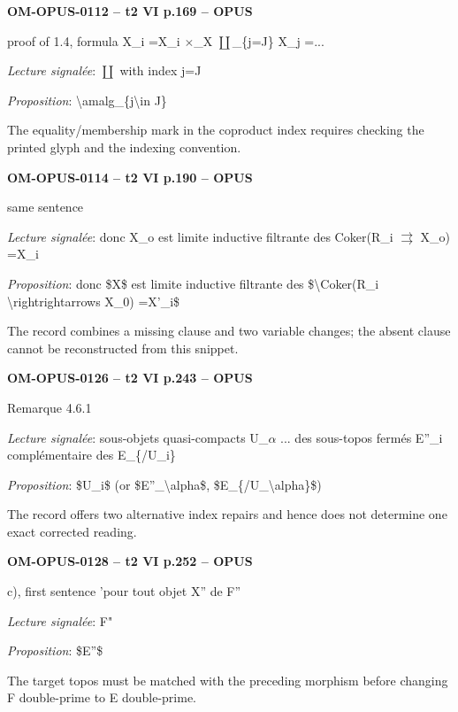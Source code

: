 \par\noindent\textbf{OM-OPUS-0112 -- t2 VI p.169 -- OPUS}\par
proof of 1.4, formula X\_i =\allowbreak  X\_i \ensuremath{\times}\_X \ensuremath{\coprod}\_\{j=\allowbreak J\} X\_j =\allowbreak  ...\par
\emph{Lecture signalée}: \ensuremath{\coprod} with index j=\allowbreak J\par
\emph{Proposition}: \textbackslash{}amalg\_\{j\textbackslash{}in J\}\par
The equality/membership mark in the coproduct index requires checking the printed glyph and the indexing convention.\par
\par\noindent\textbf{OM-OPUS-0114 -- t2 VI p.190 -- OPUS}\par
same sentence\par
\emph{Lecture signalée}: donc X\_o est limite inductive filtrante des Coker(R\_i \ensuremath{\rightrightarrows} X\_o) =\allowbreak  X\_i\par
\emph{Proposition}: donc \$X\$ est limite inductive filtrante des \$\textbackslash{}Coker(R\_i \textbackslash{}rightrightarrows X\_0) =\allowbreak  X'\_i\$\par
The record combines a missing clause and two variable changes; the absent clause cannot be reconstructed from this snippet.\par
\par\noindent\textbf{OM-OPUS-0126 -- t2 VI p.243 -- OPUS}\par
Remarque 4.6.1\par
\emph{Lecture signalée}: sous-objets quasi-compacts U\_\ensuremath{\alpha} ... des sous-topos fermés E''\_i complémentaire des E\_\{/U\_i\}\par
\emph{Proposition}: \$U\_i\$ (or \$E''\_\textbackslash{}alpha\$, \$E\_\{/U\_\textbackslash{}alpha\}\$)\par
The record offers two alternative index repairs and hence does not determine one exact corrected reading.\par
\par\noindent\textbf{OM-OPUS-0128 -- t2 VI p.252 -- OPUS}\par
c), first sentence 'pour tout objet X'' de F''\par
\emph{Lecture signalée}: F"\par
\emph{Proposition}: \$E''\$\par
The target topos must be matched with the preceding morphism before changing F double-prime to E double-prime.\par
